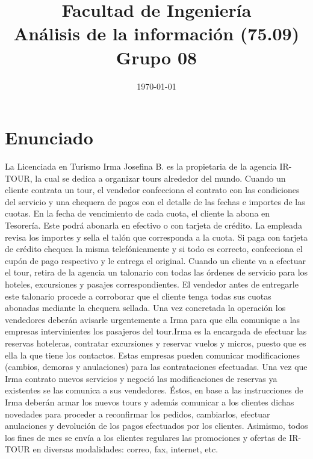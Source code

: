 \documentclass[12pt,a4paper,titlepage,oneside]{article}
\title{Facultad de Ingeniería\\Análisis de la información (75.09) \\ Grupo 08}
\date{\today}
\begin{document}
    \fancyhead[LE]{\leftmark} 
    \fancyhead[RO]{\rightmark} 
    \renewcommand{\headrulewidth}{0.4pt} 
    \renewcommand{\footrulewidth}{0pt}

    \pagestyle{fancy}


 \maketitle
  \setcounter{page}{1}
  \tableofcontents

\newpage{}
\setcounter{page}{1}

\section{Enunciado}

La Licenciada en Turismo Irma Josefina B. es la propietaria de la agencia IR-TOUR, la cual se dedica a organizar tours alrededor del mundo.
Cuando un cliente contrata un tour, el vendedor confecciona el contrato con las condiciones del servicio y una chequera de pagos con el detalle de las fechas e importes de las cuotas.
En la fecha de vencimiento de cada cuota, el cliente la abona en Tesorería. Este podrá abonarla en efectivo o con tarjeta de crédito. La empleada revisa los importes y sella el talón que corresponda a la cuota. Si paga con tarjeta de crédito chequea la misma telefónicamente y si todo es correcto, confecciona el cupón de pago respectivo y le entrega el original. Cuando un cliente va a efectuar el tour, retira de la agencia un talonario con todas las órdenes de servicio para los hoteles, excursiones y pasajes correspondientes. El vendedor antes de entregarle este talonario procede a corroborar que el cliente tenga todas sus cuotas abonadas mediante la chequera sellada. Una vez concretada la operación los vendedores deberán avisarle urgentemente a Irma para que ella comunique a las empresas intervinientes los pasajeros del tour.Irma es la encargada de efectuar las reservas hoteleras, contratar excursiones y reservar vuelos y micros, puesto que es ella la que tiene los contactos. Estas empresas pueden comunicar modificaciones (cambios, demoras y anulaciones) para las contrataciones efectuadas. Una vez que Irma contrato nuevos servicios y negoció las modificaciones de reservas ya existentes se las comunica a sus vendedores. Éstos, en base a las instrucciones de Irma deberán armar los nuevos tours y además comunicar a los clientes dichas novedades para proceder a reconfirmar los pedidos, cambiarlos, efectuar anulaciones y devolución de los pagos efectuados por los clientes.
Asimismo, todos los fines de mes se envía a los clientes regulares las promociones y ofertas de IR-TOUR en diversas modalidades: correo, fax, internet, etc.
\end{document}
